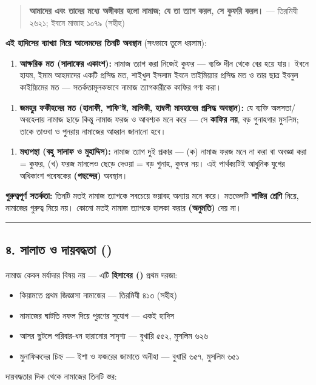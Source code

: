 \begin{quote}
\textbf{আমাদের এবং তাদের মধ্যে অঙ্গীকার হলো নামাজ; যে তা ত্যাগ করল, সে কুফরি করল।} — তিরমিযী ২৬২১; ইবনে মাজাহ ১০৭৯ (সহীহ)
\end{quote}

\textbf{এই হাদিসের ব্যাখ্যা নিয়ে আলেমদের তিনটি অবস্থান} (সৎভাবে তুলে ধরলাম):

\begin{enumerate}
\item \textbf{আক্ষরিক মত (সালাফের একাংশ):} নামাজ ত্যাগ করা নিজেই কুফর — ব্যক্তি দীন থেকে বের হয়ে যায়। ইবনে হাযম, ইমাম আহমাদের একটি প্রসিদ্ধ মত, শাইখুল ইসলাম ইবনে তাইমিয়্যার প্রসিদ্ধ মত ও তার ছাত্র ইবনুল কাইয়্যিমের মত — সতর্কতামূলকভাবে নামাজ ত্যাগকারীকে কাফির গণ্য করা।
\end{enumerate}
\begin{enumerate}
\item \textbf{জমহুর ফকীহদের মত (হানাফী, শাফি'ঈ, মালিকী, হাম্বলী মাযহাবের প্রসিদ্ধ অবস্থান):} যে ব্যক্তি অলসতা/অবহেলায় নামাজ ছাড়ে কিন্তু নামাজ ফরজ ও আবশ্যক মনে করে — সে \textbf{কাফির নয়}, বড় গুনাহগার মুসলিম; তাকে তাওবা ও পুনরায় নামাজের আহ্বান জানানো হবে।
\end{enumerate}
\begin{enumerate}
\item \textbf{মধ্যপন্থা (বহু সালাফ ও মুহাদ্দিস):} নামাজ ত্যাগ দুই প্রকার — (ক) নামাজ ফরজ মনে না করা বা অবজ্ঞা করা = কুফর, (খ) ফরজ মানলেও ছেড়ে দেওয়া = বড় গুনাহ, কুফর নয়। এই পার্থক্যটিই আধুনিক যুগের অধিকাংশ গবেষকের \textbf{ (পছন্দের)} অবস্থান।
\end{enumerate}
\textbf{গুরুত্বপূর্ণ সতর্কতা:} তিনটি মতই নামাজ ত্যাগকে সবচেয়ে ভয়াবহ অন্যায় মনে করে। মতভেদটি \textbf{শাস্তির শ্রেণি} নিয়ে, নামাজের গুরুত্ব নিয়ে নয়। কোনো মতই নামাজ ত্যাগকে হালকা করার \textbf{ (অনুমতি)} দেয় না।

\medskip\hrule\medskip

\subsection*{৪. সালাত ও দায়বদ্ধতা ()}

নামাজ কেবল মর্যাদার বিষয় নয় — এটি \textbf{হিসাবের ()} প্রথম দরজা:

\begin{itemize}
\item কিয়ামতে প্রথম জিজ্ঞাসা নামাজের — তিরমিযী ৪১৩ (সহীহ)
\item নামাজের ঘাটতি নফল দিয়ে পূরণের সুযোগ — একই হাদিস
\item আসর ছুটলে পরিবার-ধন হারানোর সাদৃশ্য — বুখারি ৫৫২, মুসলিম ৬২৬
\item মুনাফিকদের চিহ্ন — ইশা ও ফজরের জামাতে অনীহা — বুখারি ৬৫৭, মুসলিম ৬৫১
\end{itemize}
দায়বদ্ধতার দিক থেকে নামাজের তিনটি স্তর:

